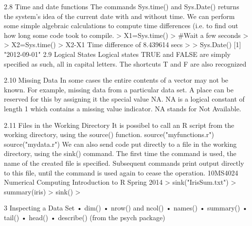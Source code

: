 \documentclass{beamer}
\begin{document}
\begin{frame}

2.8 Time and date functions
The commands Sys.time() and Sys.Date() returns the system’s idea of the current date
with and without time. We can perform some simple algebraic calculations to compute time
differences (i.e. to find out how long some code took to compile.
> X1=Sys.time()
> #Wait a few seconds
>
> X2=Sys.time()
> X2-X1 Time difference of 8.439614 secs
>
> Sys.Date() [1] "2012-09-01"
2.9 Logical States
Logical states TRUE and FALSE are simply specified as such, all in capital letters. The
shortcuts T and F are also recognized

\end{frame}
\begin{frame}


2.10 Missing Data
In some cases the entire contents of a vector may not be known. For example, missing data
from a particular data set. A place can be reserved for this by assigning it the special value
NA.
NA is a logical constant of length 1 which contains a missing value indicator. NA stands
for Not Available.

\end{frame}
\begin{frame}

2.11 Files in the Working Directory
It is possibel to call an R script from the working directory, using the source() function.
source("myfunctions.r")
source("mydata.r")
We can also send code put directly to a file in the working directory, using the sink()
command. The first time the command is used, the name of the created file is specified.
Subsequent commands print output directly to this file, until the command is used again to
cease the operation.
10MS4024 Numerical Computing Introduction to R Spring 2014
> sink("IrisSum.txt")
> summary(iris)
> sink()
>

\end{frame}
\begin{frame}

3 Inspecting a Data Set
• dim()
• nrow() and ncol()
• names()
• summary()
• tail()
• head()
• describe() (from the psych package)
\end{frame}
\end{document}

